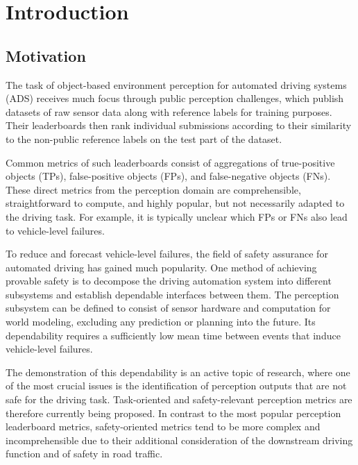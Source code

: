 \documentclass[conference]{IEEEtran}
\begin{document}


\section{Introduction}
\label{sec:introduction}

\subsection{Motivation}

The task of object-based environment perception for automated driving systems (ADS) receives much focus through public perception challenges, %
which publish datasets of raw sensor data along with reference labels for training purposes. 
Their leaderboards then rank individual submissions according to their similarity to the non-public reference labels on the test part of the dataset.

Common metrics of such leaderboards consist of aggregations of true-positive objects (TPs), false-positive objects (FPs), and false-negative objects (FNs). 
These direct metrics from the perception domain are comprehensible, straightforward to compute, and highly popular, but not necessarily adapted to the driving task. 
For example, it is typically unclear which FPs or FNs also lead to vehicle-level failures. 

To reduce and forecast vehicle-level failures, the field of safety assurance for automated driving has gained much popularity. 
One method of achieving provable safety is to decompose the driving automation system into different subsystems and establish dependable interfaces between them. 
The perception subsystem can be defined to consist of sensor hardware and computation for world modeling, excluding any prediction or planning into the future. 
Its dependability requires a sufficiently low mean time between events that induce vehicle-level failures. 


The demonstration of this dependability is an active topic of research, where one of the most crucial issues is the identification of perception outputs that are not safe for the driving task. 
Task-oriented and safety-relevant perception metrics are therefore currently being proposed. 
In contrast to the most popular perception leaderboard metrics, safety-oriented metrics tend to be more complex and incomprehensible due to their additional consideration of the downstream driving function and of safety in road traffic. 
\end{document}

